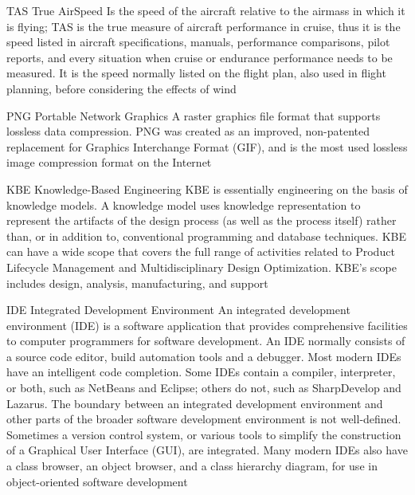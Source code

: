 %
  {TAS}            %
  {True AirSpeed}  %
  {Is the speed of the aircraft relative to the airmass in which it is flying; TAS is the true measure of aircraft performance in cruise, thus it is the speed listed in aircraft specifications, manuals, performance comparisons, pilot reports, and every situation when cruise or endurance performance needs to be measured. It is the speed normally listed on the flight plan, also used in flight planning, before considering the effects of wind}
  
  {PNG}            %
  {Portable Network Graphics}  %
  {A raster graphics file format that supports lossless data compression. PNG was created as an improved, non-patented replacement for Graphics Interchange Format (GIF), and is the most used lossless image compression format on the Internet} %
  

  {KBE}            %
  {Knowledge-Based Engineering}  %
  {KBE is essentially engineering on the basis of knowledge models. A knowledge model uses knowledge representation to represent the artifacts of the design process (as well as the process itself) rather than, or in addition to, conventional programming and database techniques. KBE can have a wide scope that covers the full range of activities related to Product Lifecycle Management and Multidisciplinary Design Optimization. KBE's scope includes design, analysis, manufacturing, and support} %

  {IDE}            %
  {Integrated Development Environment}  %
  {An integrated development environment (IDE) is a software application that provides comprehensive facilities to computer programmers for software development. An IDE normally consists of a source code editor, build automation tools and a debugger. Most modern IDEs have an intelligent code completion. Some IDEs contain a compiler, interpreter, or both, such as NetBeans and Eclipse; others do not, such as SharpDevelop and Lazarus. The boundary between an integrated development environment and other parts of the broader software development environment is not well-defined. Sometimes a version control system, or various tools to simplify the construction of a Graphical User Interface (GUI), are integrated. Many modern IDEs also have a class browser, an object browser, and a class hierarchy diagram, for use in object-oriented software development} %

